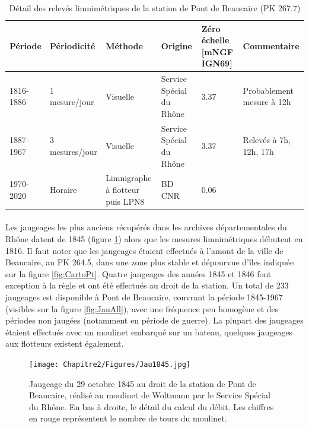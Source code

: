     
	\begin{table}[h]
	\centering
	\caption{Détail des relevés limnimétriques de la station de Pont de Beaucaire (PK 267.7)}
    \label{tab:MesuresPtBcr}
       \begin{tabular}{| m{2cm} | m{2.7cm}| m{2.2cm} | m{2.8cm} | m{2.9cm} | m{2.5cm} |} 
                \hline
               Période & Périodicité & Méthode & Origine & Zéro échelle [mNGF IGN69] & Commentaire \\
                \hline
                1816-1886 & 1 mesure/jour & Visuelle & 
                Service Spécial du Rhône & 3.37 & Probablement mesure à 12h \\
                \hline
                1887-1967 & 3 mesures/jour & Visuelle & 
                Service Spécial du Rhône & 3.37 & Relevés à 7h, 12h, 17h\\
                \hline
               1970-2020 & Horaire & Limnigraphe à flotteur puis LPN8 & 
                BD CNR & 0.06 &  \\
                \hline
		\end{tabular}
       \end{table}       
       
   
       
    \paragraph{} Les jaugeages les plus anciens récupérés dans les archives départementales du Rhône datent de 1845 (figure \ref{fig:Jau1845}) alors que les mesures limnimétriques débutent en 1816. Il faut noter que les jaugeages étaient effectués à l'amont de la ville de Beaucaire, au PK 264.5, dans une zone plus stable et dépourvue d'îles indiquée sur la figure \ref{fig:CartoPt}. Quatre jaugeages des années 1845 et 1846 font exception à la règle et ont été effectués au droit de la station. Un total de 233 jaugeages est disponible à Pont de Beaucaire, couvrant la période 1845-1967 (visibles sur la figure \ref{fig:JauAll}), avec une fréquence peu homogène et des périodes non jaugées (notamment en période de guerre). La plupart des jaugeages étaient effectués avec un moulinet embarqué sur un bateau, quelques jaugeages aux flotteurs existent également. 
    
    \begin{figure}[h]
	\centering
		\texttt{[image: Chapitre2/Figures/Jau1845.jpg]}
        \caption{Jaugeage du 29 octobre 1845 au droit de la station de Pont de Beaucaire, réalisé au moulinet de Woltmann par le Service Spécial du Rhône. En bas à droite, le détail du calcul du débit. Les chiffres en rouge représentent le nombre de tours du moulinet.}	
		\label{fig:Jau1845}
	\end{figure}
    	
